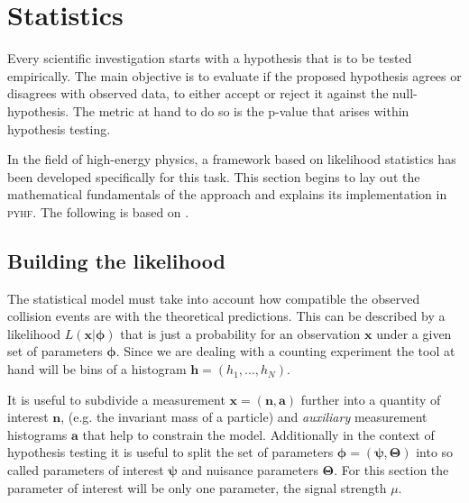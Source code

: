 \section{Statistics}\label{sec:statistics}

Every scientific investigation starts with a hypothesis that is to be tested empirically. The main objective is to evaluate if the proposed hypothesis agrees or disagrees with observed data, to either accept or reject it against the null-hypothesis. The metric at hand to do so is the p-value that arises within hypothesis testing. 

In the field of high-energy physics, a framework based on likelihood statistics has been developed specifically for this task. This section begins to lay out the mathematical fundamentals of the approach and explains its implementation in \textsc{pyhf}. The following is based on \citep{cowan2011asymptotic,behnke2013data,pyhf_intro}.
 
\subsection{Building the likelihood}
The statistical model must take into account how compatible the observed collision events are with the theoretical predictions. This can be described by a likelihood $L(\bm{x} | \bm{\phi})$ that is just a probability for an observation $\bm{x}$ under a given set of parameters $\bm{\phi}$. Since we are dealing with a counting experiment the tool at hand will be bins of a histogram $\bm{h}=(h_1,...,h_N)$. 

It is useful to subdivide a measurement $\bm{x}=(\bm{n},\bm{a})$ further into a quantity of interest $\bm{n}$, (e.g. the invariant mass of a particle) and \textit{auxiliary} measurement histograms $\bm{a}$ that help to constrain the model. Additionally in the context of hypothesis testing it is useful to split the set of parameters $\bm{\phi}=(\bm{\psi},\bm{\Theta})$ into so called parameters of interest $\bm{\psi}$ and nuisance parameters $\bm{\Theta}$. For this section the parameter of interest will be only one parameter, the signal strength $\mu$. 

